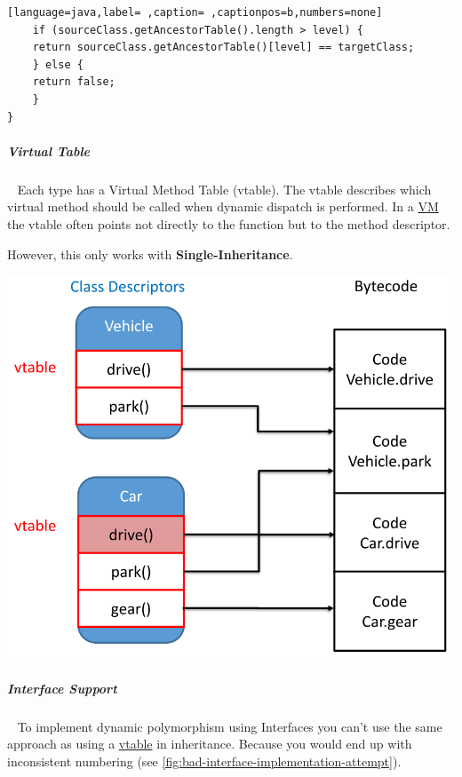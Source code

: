 \documentclass[12pt,twoside,landscape]{extarticle}
\begin{document}
\begin{multicols}{4}
\begin{lstlisting}[language=java,label= ,caption= ,captionpos=b,numbers=none]
    if (sourceClass.getAncestorTable().length > level) {
	return sourceClass.getAncestorTable()[level] == targetClass;
    } else {
	return false;
    }
}
\end{lstlisting}

\subparagraph{Virtual Table} \
\label{sec:orgb4781b1}
Each type has a Virtual Method Table (vtable).
The vtable describes which virtual method should be called when dynamic dispatch is performed. 
In a \href{../../../roam/20221230173400-what_is_a_virtual_machine.org}{VM} the vtable often points not directly to the function but to the method descriptor.

However, this only works with \textbf{Single-Inheritance}.

{
\begin{center}
\includegraphics[width=.9\linewidth]{img/vtable_example.png}
\end{center}
\label{fig:vtable-example}
}

\subparagraph{Interface Support} \
\label{sec:org2c81d77}
To implement dynamic polymorphism using Interfaces you can't use the same approach as using a \href{../../../roam/20221230181314-what_is_the_virtual_method_table.org}{vtable} in inheritance.
Because you would end up with inconsistent numbering (see \autoref{fig:bad-interface-implementation-attempt}).


\end{multicols}
\end{document}
